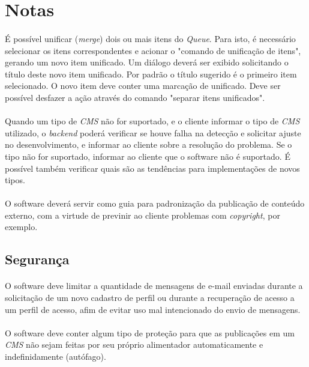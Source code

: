 \documentclass[a4paper,12pt]{article}
\def\cms{\emph{CMS}}
\def\queue{\emph{Queue}}
\begin{document}
\appendix

\section{Notas}

\paragraph{}
É possível unificar (\emph{merge}) dois ou mais itens do \queue{}. Para isto, é
necessário selecionar os itens correspondentes e acionar o "comando de
unificação de itens", gerando um novo item unificado. Um diálogo deverá ser
exibido solicitando o título deste novo item unificado. Por padrão o título
sugerido é o primeiro item selecionado. O novo item deve conter uma marcação de
unificado. Deve ser possível desfazer a ação através do comando "separar itens
unificados".

\paragraph{}
Quando um tipo de \cms{} não for suportado, e o cliente informar o tipo de
\cms{} utilizado, o \emph{backend} poderá verificar se houve falha na detecção
e solicitar ajuste no desenvolvimento, e informar ao cliente sobre a resolução
do problema. Se o tipo não for suportado, informar ao cliente que o software
não é suportado. É possível também verificar quais são as tendências para
implementações de novos tipos.

\paragraph{}
O software deverá servir como guia para padronização da publicação de conteúdo
externo, com a virtude de previnir ao cliente problemas com \emph{copyright},
por exemplo.

\subsection{Segurança}

\paragraph{}
O software deve limitar a quantidade de mensagens de e-mail enviadas durante a
solicitação de um novo cadastro de perfil ou durante a recuperação de acesso a
um perfil de acesso, afim de evitar uso mal intencionado do envio de mensagens.

\paragraph{}
O software deve conter algum tipo de proteção para que as publicações em um
\cms{} não sejam feitas por seu próprio alimentador automaticamente e
indefinidamente (autófago).
\end{document}
